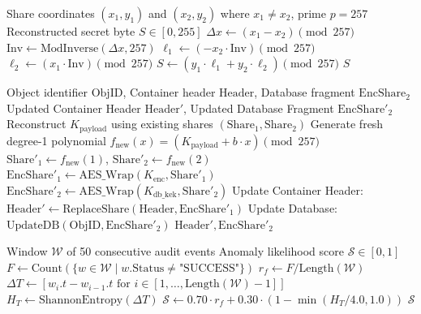 \documentclass[pdflatex,sn-mathphys,Numbered]{sn-jnl}%
\theoremstyle{thmstyleone}%
\theoremstyle{thmstyletwo}%
\theoremstyle{thmstylethree}%
\begin{document}
\begin{algorithm}[!htbp]
\caption{Finite Field Lagrange Reconstruction over $\text{GF}(257)$}
\label{alg:lagrange}
\begin{algorithmic}[1]
\Require Share coordinates $(x_1, y_1)$ and $(x_2, y_2)$ where $x_1 \neq x_2$, prime $p=257$
\Ensure Reconstructed secret byte $S \in [0, 255]$
\State $\Delta x \gets (x_1 - x_2) \pmod{257}$
\State $\text{Inv} \gets \text{ModInverse}(\Delta x, 257)$ 
\State $\ell_1 \gets (-x_2 \cdot \text{Inv}) \pmod{257}$
\State $\ell_2 \gets (x_1 \cdot \text{Inv}) \pmod{257}$
\State $S \gets (y_1 \cdot \ell_1 + y_2 \cdot \ell_2) \pmod{257}$
\State \Return $S$
\end{algorithmic}
\end{algorithm}

\begin{algorithm}[!htbp]
\caption{Zero-Trust Key Rotation and Multi-Domain Re-encryption}
\label{alg:rotation}
\begin{algorithmic}[1]
\Require Object identifier $\text{ObjID}$, Container header $\text{Header}$, Database fragment $\text{EncShare}_2$
\Ensure Updated Container Header $\text{Header}'$, Updated Database Fragment $\text{EncShare}'_2$
\State Reconstruct $K_{\text{payload}}$ using existing shares $(\text{Share}_1, \text{Share}_2)$
\State Generate fresh degree-1 polynomial $f_{\text{new}}(x) = (K_{\text{payload}} + b \cdot x) \pmod{257}$
\State $\text{Share}'_1 \gets f_{\text{new}}(1)$, $\text{Share}'_2 \gets f_{\text{new}}(2)$
\State $\text{EncShare}'_1 \gets \text{AES\_Wrap}(K_{\text{enc}}, \text{Share}'_1)$
\State $\text{EncShare}'_2 \gets \text{AES\_Wrap}(K_{\text{db\_kek}}, \text{Share}'_2)$
\State Update Container Header: $\text{Header}' \gets \text{ReplaceShare}(\text{Header}, \text{EncShare}'_1)$
\State Update Database: $\text{UpdateDB}(\text{ObjID}, \text{EncShare}'_2)$
\State \Return $\text{Header}', \text{EncShare}'_2$
\end{algorithmic}
\end{algorithm}

\begin{algorithm}[!htbp]
\caption{Sliding-Window Bayesian Anomaly Classification Routine}
\label{alg:anomaly}
\begin{algorithmic}[1]
\Require Window $\mathcal{W}$ of 50 consecutive audit events
\Ensure Anomaly likelihood score $\mathcal{S} \in [0, 1]$
\State $F \gets \text{Count}(\{w \in \mathcal{W} \mid w.\text{Status} \neq \text{"SUCCESS"}\})$
\State $r_f \gets F / \text{Length}(\mathcal{W})$
\State $\Delta T \gets [w_i.t - w_{i-1}.t \text{ for } i \in [1, \dots, \text{Length}(\mathcal{W})-1]]$
\State $H_T \gets \text{ShannonEntropy}(\Delta T)$
\State $\mathcal{S} \gets 0.70 \cdot r_f + 0.30 \cdot (1 - \min(H_T / 4.0, 1.0))$
\State \Return $\mathcal{S}$
\end{algorithmic}
\end{algorithm}
\end{document}
